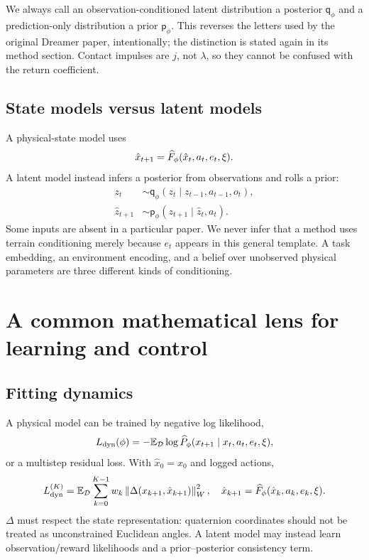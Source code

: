 We always call an observation-conditioned latent distribution a posterior
$\mathsf q_\phi$ and a prediction-only distribution a prior $\mathsf p_\phi$.
This reverses the letters used by the original Dreamer paper, intentionally;
the distinction is stated again in its method section. Contact impulses are
$j$, not $\lambda$, so they cannot be confused with the return coefficient.

\subsection{State models versus latent models}
A physical-state model uses
\begin{equation}
\hat x_{t+1}=\widehat F_\phi(\hat x_t,a_t,e_t,\xi).
\end{equation}
A latent model instead infers a posterior from observations and rolls a prior:
\begin{align}
z_t&\sim\mathsf q_\phi(z_t\mid z_{t-1},a_{t-1},o_t),\\
\hat z_{t+1}&\sim\mathsf p_\phi(z_{t+1}\mid\hat z_t,a_t).
\end{align}
Some inputs are absent in a particular paper. We never infer that a method uses
terrain conditioning merely because $e_t$ appears in this general template.
A task embedding, an environment encoding, and a belief over unobserved
physical parameters are three different kinds of conditioning.

\section{A common mathematical lens for learning and control}\label{sec:common}
\subsection{Fitting dynamics}
A physical model can be trained by negative log likelihood,
\begin{equation}\label{eq:nll}
L_{\rm dyn}(\phi)=-\mathbb E_{\mathcal D}\log\widehat P_\phi(x_{t+1}\mid x_t,a_t,e_t,\xi),
\end{equation}
or a multistep residual loss. With $\hat x_0=x_0$ and logged actions,
\begin{equation}\label{eq:multistep}
L_{\rm dyn}^{(K)}=\mathbb E_{\mathcal D}\sum_{k=0}^{K-1}w_k
\left\lVert\Delta(x_{k+1},\hat x_{k+1})\right\rVert_{W}^{2},\quad
\hat x_{k+1}=\widehat F_\phi(\hat x_k,a_k,e_k,\xi).
\end{equation}
$\Delta$ must respect the state representation: quaternion coordinates should
not be treated as unconstrained Euclidean angles. A latent model may instead
learn observation/reward likelihoods and a prior--posterior consistency term.

